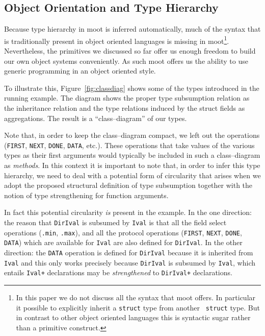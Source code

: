 \documentclass{sigplanconf}
\newcommand{\concept}[1]{\emph{#1}}
\begin{document}
\subsection{Object Orientation and Type Hierarchy}

Because type hierarchy in {\sc moot} is inferred automatically, much
of the syntax that is traditionally present in object oriented
languages is missing in {\sc moot}\footnote{In this paper we do not
  discuss all the syntax that {\sc moot} offers. In particular it
  possible to explicitly inherit a {\tt struct} type from another {\tt
    struct} type. But in contrast to other object oriented languages
  this is syntactic sugar rather than a primitive
  construct.}. Nevertheless, the primitives we discussed so far offer
us enough freedom to build our own object systems conveniently. As
such {\sc moot} offers us the ability to use generic programming in an
object oriented style.

To illustrate this, Figure~\ref{fig:classdiag} shows some of the types
introduced in the running example. The diagram shows the proper type
subsumption relation as the inheritance relation and the type
relations induced by the struct fields as aggregations. The result is
a ``class--diagram'' of our types.

Note that, in order to keep the class--diagram compact, we left out
the operations (\verb+FIRST+, \verb+NEXT+, \verb+DONE+, \verb+DATA+,
etc.). These operations that take values of the various types as their
first arguments would typically be included in such a class--diagram
as \emph{methods}. In this context it is important to note that, in
order to infer this type hierarchy, we need to deal with a potential
form of circularity that arises when we adopt the proposed structural
definition of type subsumption together with the notion of type
strengthening for function arguments.

In fact this potential circularity \emph{is} present in the example.
In the one direction: the reason that \verb+DirIval+ is subsumed by
\verb+Ival+ is that all the field select operations (\verb+.min+,
\verb+.max+), and all the protocol operations (\verb+FIRST+,
\verb+NEXT+, \verb+DONE+, \verb+DATA+) which are available for
\verb+Ival+ are also defined for \verb+DirIval+. In the other
direction: the \verb+DATA+ operation is defined for \verb+DirIval+
because it is inherited from \verb+Ival+ and this only works precisely
because \verb+DirIval+ is subsumed by \verb+Ival+, which entails
\verb-Ival+- declarations may be \concept{strengthened} to
\verb-DirIval+- declarations.
\end{document}
